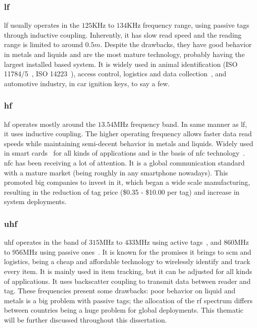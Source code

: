 \subsubsection{\acf{lf}}

\ac{lf} usually operates in the $125$KHz to $134$KHz frequency range, using passive tags through inductive coupling. Inherently, it has slow read speed and the reading range is limited to around $0.5m$. Despite the drawbacks, they have good behavior in metals and liquids and are the most mature technology, probably having the largest installed based system.
It is widely used in animal identification (ISO 11784/5~\cite{isoISO117841996, isoISO117851996}, ISO 14223~\cite{isoISO1422332018}), access control, logistics and data collection~\cite{isoISOIEC180002}, and automotive industry, in car ignition keys, to say a few.

\subsubsection{\acf{hf}}

\ac{hf} operates mostly around the $13.54$MHz frequency band. In same manner as \ac{lf}, it uses inductive coupling. The higher operating frequency allows faster data read speeds while maintaining semi-decent behavior in metals and liquids.
Widely used in smart cards~\cite{isoISOIEC156932, MIFARE} for all kinds of applications and is the basis of \ac{nfc} technology~\cite{isoISOIEC144434, isoISOIEC180003}. \ac{nfc} has been receiving a lot of attention. It is a global communication standard with a mature market (being roughly in any smartphone nowadays). This promoted big companies to invest in it, which began a wide scale manufacturing, resulting in the reduction of tag price (\$0.35 - \$10.00 per tag) and increase in system deployments.

\subsubsection{\acf{uhf}}

\ac{uhf} operates in the band of $315$MHz to $433$MHz using active tags~\cite{isoISOIEC180007}, and $860$MHz to $956$MHz using passive ones~\cite{isoISOIEC180006}. It is known for the promises it brings to \ac{scm} and logistics, being a cheap and affordable technology to wirelessly identify and track every item. It is mainly used in item tracking, but it can be adjusted for all kinds of applications. It uses backscatter coupling to transmit data between reader and tag. These frequencies present some drawbacks: poor behavior on liquid and metals is a big problem with passive tags; the allocation of the \ac{rf} spectrum differs between countries being a huge problem for global deployments. This thematic will be further discussed throughout this dissertation.

